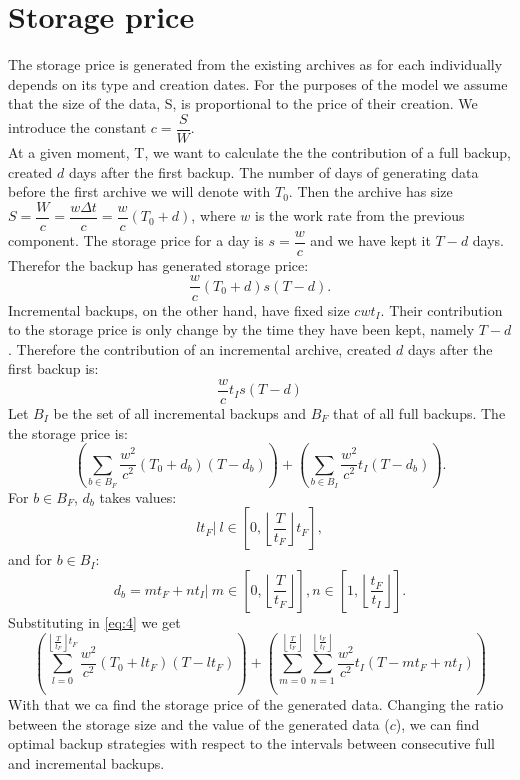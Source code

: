 \documentclass[11pt, a4paper]{article}
\theoremstyle{definition}
\begin{document}
\section{Storage price}
	The storage price is generated from the existing archives as for each individually depends on its type and creation dates. For the purposes of the model we assume that the size of the data, S, is proportional to the price of their creation. We introduce the constant $c=\dfrac{S}{W}$.\\
	At a given moment, T, we want to calculate the the contribution of a full backup, created $d$ days after the first backup. The number of days of generating data before the first archive we will denote with $T_0$. Then the archive has size $S=\dfrac{W}{c}=\dfrac{w\Delta t}{c}=\dfrac{w}{c}(T_0 + d)$, where $w$ is the work rate from the previous component. The storage price for a day is $s=\dfrac{w}{c}$ and we have kept it $T-d$ days. Therefor the backup has generated storage price:
	$$
	\dfrac{w}{c}(T_0 + d)s(T-d).
	$$
	Incremental backups, on the other hand, have fixed size $cwt_I$. Their contribution to the storage price is only change by the time they have been kept, namely $T-d$. Therefore the contribution of an incremental archive, created $d$ days after the first backup is:
	$$
	\dfrac{w}{c}t_Is(T-d)
	$$
	Let $B_I$ be the set of all incremental backups and $B_F$ that of all full backups. The the storage price is:
	\begin{equation}\label{eq:5}
		\left(\displaystyle\sum_{b\in B_F}\dfrac{w^2}{c^2}(T_0 + d_b)(T-d_b)\right) + 	\left(\displaystyle\sum_{b\in B_I}\dfrac{w^2}{c^2}t_I(T-d_b)\right).
	\end{equation}
	For $b\in B_F$, $d_b$ takes values:
	$$lt_F|\ l\in \left[0,\left\lfloor\dfrac{T}{t_F}\right\rfloor t_F\right],$$
	and for $b\in  B_I$:
	$$d_b= mt_F + nt_I|\ m\in \left[0, \left\lfloor\dfrac{T}{t_F}\right\rfloor\right],n\in \left[1, \left\lfloor\dfrac{t_F}{t_I}\right\rfloor\right].$$
	Substituting in \ref{eq:4} we get
	\begin{equation}
		\left(\displaystyle\sum_{l = 0}^{\left\lfloor\frac{T}{t_F}\right\rfloor t_F}\dfrac{w^2}{c^2}(T_0 + lt_F)(T-lt_F)\right) + \left(\displaystyle\sum_{m = 0}^{\left\lfloor\frac{T}{t_F}\right\rfloor}\displaystyle\sum_{n = 1}^{\left\lfloor\frac{t_F}{t_I}\right\rfloor}\dfrac{w^2}{c^2}t_I(T-mt_F + nt_I)\right)
	\end{equation}
	With that we ca find the storage price of the generated data. Changing the ratio between the storage size and the value of the generated data ($c$), we can find optimal backup strategies with respect to the intervals between consecutive full and incremental backups.
\end{document}

